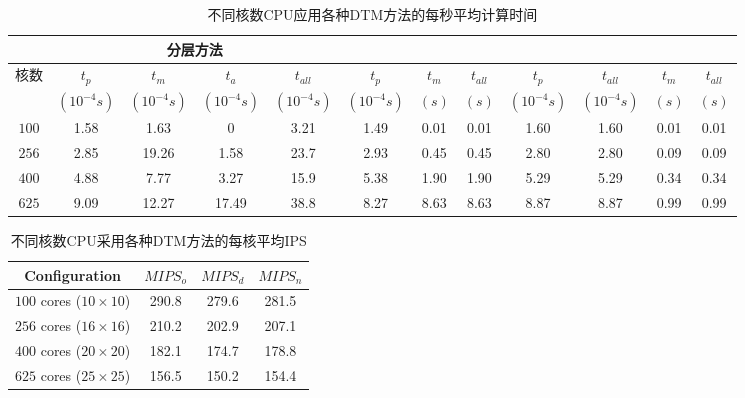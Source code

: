  \begin{table*}
   \tabcolsep=2pt
    \caption{不同核数CPU应用各种DTM方法的每秒平均计算时间\label{tab:time}}{
    \begin{tabular}{|c|c|c|c|c|c|c|c|c|c|c|c|}
    \hline
   	        & \multicolumn{4}{c|}{分层方法} & \multicolumn{3}{c|}{\cite{MaWang:APCCAS'14}} & \multicolumn{2}{c|}{\cite{Zanini:ECCTD'09}}& \multicolumn{2}{c|}{\cite{Hanumaiah:TCAD'11}} \\
    \hline
   核数	& $t_p$ & $t_m$ &$t_a$ &
   $t_{all}$ & $t_p$ & $t_m$ &$t_{all}$  &
   $t_p$ &$t_{all}$ & $t_{m}$ &$t_{all}$\\
                                  &   $(10^{-4}s)$ & $(10^{-4}s)$ &
                                  $(10^{-4}s)$ & $(10^{-4}s)$ & $(10^{-4}s)$
                                  &   $(s)$  & $(s)$  & $(10^{-4}s)$ & $(10^{-4}s)$ &   $(s)$  & $(s)$\\
    \hline 
    \hline
   $100$ & 1.58 & 1.63  & 0     & 3.21 & 1.49 & 0.01 & 0.01 & 1.60 & 1.60 & 0.01 & 0.01\\
    \hline
   $256$ & 2.85 & 19.26 & 1.58  & 23.7 & 2.93 & 0.45 & 0.45 & 2.80 & 2.80 & 0.09 & 0.09\\
    \hline
   $400$ & 4.88 & 7.77  & 3.27  & 15.9 & 5.38 & 1.90 & 1.90 & 5.29 & 5.29 & 0.34 & 0.34\\
    \hline
   $625$ & 9.09 & 12.27 & 17.49 & 38.8 & 8.27 & 8.63 & 8.63 & 8.87 & 8.87 & 0.99 & 0.99\\
    \hline
    \hline
    \end{tabular}}
    \end{table*}
   

\begin{table}
\centering
 \caption{不同核数CPU采用各种DTM方法的每核平均IPS \label{tab:ips}}{
 \begin{tabular}{|c|c|c|c|}
 \hline
 \hline
 Configuration  &$MIPS_o$ & $MIPS_d$  & $MIPS_n$ \\%
 \hline 
 \hline
 $100$ cores ($10 \times 10$) & 290.8 & 279.6 & 281.5 \\%
 \hline
 $256$ cores ($16 \times 16$) & 210.2 & 202.9 & 207.1 \\%
 \hline
 $400$ cores ($20 \times 20$) & 182.1 & 174.7 & 178.8 \\%
 \hline
 $625$ cores ($25 \times 25$) & 156.5 & 150.2 & 154.4 \\%
 \hline
 \hline
 \end{tabular}}
 \end{table}
 
